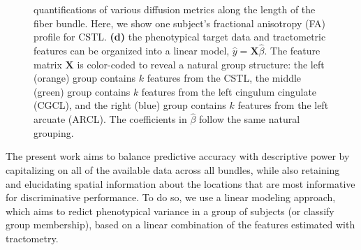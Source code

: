 \documentclass[10pt,%
               aps,%
               prl,%
               reprint,%
               superscriptaddress,%
               preprintnumbers,%
               linenumbers,%
               amsmath,%
               floatfix]{revtex4-1}
\begin{document}
\begin{figure}[h!]
{        quantifications of various diffusion metrics along the length of the
        fiber bundle. Here, we show one subject's fractional anisotropy (FA)
        profile for CSTL.
        {\bf (d)} the phenotypical target data and tractometric features can
        be organized into a linear model, $\hat{y} = \mathbf{X}
        \hat{\beta}$. The feature matrix $\mathbf{X}$ is color-coded
        to reveal a natural group structure: the left (orange) group
        contains $k$ features from the CSTL, the middle (green) group
        contains $k$ features from the left cingulum cingulate (CGCL),
        and the right (blue) group
        contains $k$ features from the left arcuate (ARCL). The coefficients in
        $\hat{\beta}$ follow the same natural grouping.
    }
\end{figure}

The present work aims to balance predictive accuracy with descriptive power
\cite{Murdoch2019-ax, Breiman2001-uz} by capitalizing on all of the available
data across all bundles, while also retaining and elucidating spatial
information about the locations that are most informative for discriminative
performance. To do so, we use a linear modeling approach, which aims to
redict phenotypical variance in a group of subjects (or classify group
membership), based on a linear combination of the features estimated with
tractometry.

\end{document}
